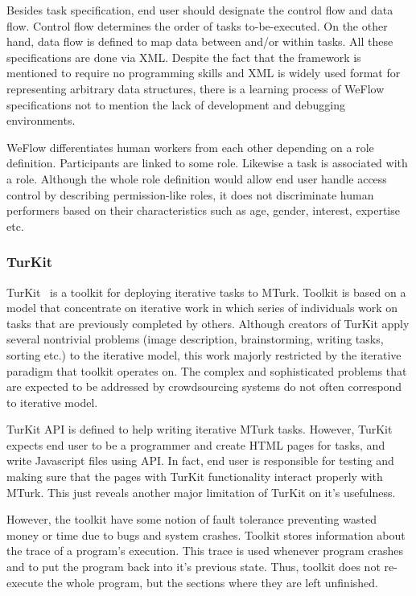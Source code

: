 Besides task specification, end user should designate the control flow and 
data flow. Control flow determines the order of tasks to-be-executed. 
On the other hand, data flow is defined to map data between and/or within tasks. 
All these specifications are done via XML. Despite the fact that the framework 
is mentioned to require no programming skills and XML is widely used format 
for representing arbitrary data structures, there is a learning process of 
WeFlow specifications not to mention the lack of development 
and debugging environments.

WeFlow differentiates human workers from each other depending on a 
role definition. Participants are linked to some role. Likewise a task is associated 
with a role. Although the whole role definition would allow end user handle access 
control by describing permission-like roles, it does not discriminate human 
performers based on their characteristics such as age, gender, interest, expertise etc.


\subsubsection{TurKit}
TurKit~\cite{Little2009} is a toolkit for deploying iterative tasks to MTurk. 
Toolkit is based on a model that concentrate on iterative work in which series of 
individuals work on tasks that are previously completed by others. Although 
creators of TurKit apply several nontrivial problems (image description, 
brainstorming, writing tasks, sorting etc.) to the iterative model, this work 
majorly restricted by the iterative paradigm that toolkit operates on. The complex 
and sophisticated problems that are expected to be addressed by crowdsourcing 
systems do not often correspond to iterative model.

TurKit API is defined to help writing iterative MTurk tasks. However, TurKit expects 
end user to be a programmer and create HTML pages for tasks, and write 
Javascript files using API. In fact, end user is responsible for testing and making 
sure that the pages with TurKit functionality interact properly with MTurk. 
This just reveals another major limitation of TurKit on it's usefulness.

However, the toolkit have some notion of fault tolerance preventing wasted 
money or time due to bugs and system crashes. Toolkit stores information about 
the trace of a program's execution. This trace is used whenever program crashes 
and to put the program back into it's previous state. Thus, toolkit does not 
re-execute the whole program, but the sections where they are left unfinished.

